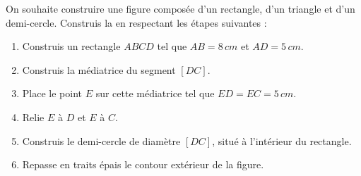 \documentclass[../../syllabus_1.tex]{subfiles}
\begin{document}
\begin{exercise}
    On souhaite construire une figure composée d'un rectangle,
    d'un triangle et d'un demi-cercle. Construis la en respectant les étapes suivantes :


    \begin{enumerate}
        \item Construis un rectangle $ABCD$ tel que
        $AB=8\,cm$ et $AD=5\,cm$.
        \item Construis la médiatrice du segment $[DC]$.
        \item Place le point $E$ sur cette médiatrice tel que
        $ED=EC=5\,cm$.
        \item Relie $E$ à $D$ et $E$ à $C$.
        \item Construis le demi-cercle de diamètre $[DC]$,
        situé à l'intérieur du rectangle.
        \item Repasse en traits épais le contour extérieur de la figure.
    \end{enumerate}
\end{exercise}
\end{document}

